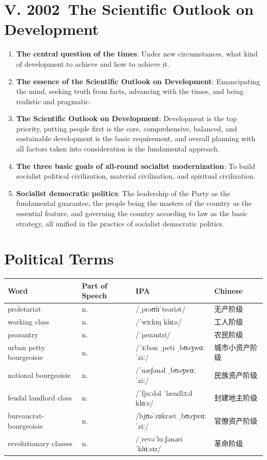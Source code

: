 \documentclass[11pt,a4paper]{ctexart}
\begin{document}
\section{V. 2002~The Scientific Outlook on Development}

\begin{enumerate}[leftmargin=2em]
    \item \textbf{The central question of the times}: Under new circumstances, what kind of development to achieve and how to achieve it.
    
    \item \textbf{The essence of the Scientific Outlook on Development}: Emancipating the mind, seeking truth from facts, advancing with the times, and being realistic and pragmatic.
    
    \item \textbf{The Scientific Outlook on Development}: Development is the top priority, putting people first is the core, comprehensive, balanced, and sustainable development is the basic requirement, and overall planning with all factors taken into consideration is the fundamental approach.
    
    \item \textbf{The three basic goals of all-round socialist modernization}: To build socialist political civilization, material civilization, and spiritual civilization.
    
    \item \textbf{Socialist democratic politics}: The leadership of the Party as the fundamental guarantee, the people being the masters of the country as the essential feature, and governing the country according to law as the basic strategy, all unified in the practice of socialist democratic politics.
\end{enumerate}

\section{Political Terms}

\begin{center}
\small
\setlength{\tabcolsep}{10pt}
\begin{tabular}{llll}
\toprule
Word & Part of Speech & IPA & Chinese \\
\midrule
proletariat & n. & /ˌprəʊlɪˈteəriət/ & 无产阶级 \\
working class & n. & /ˈwɜːkɪŋ klɑːs/ & 工人阶级 \\
peasantry & n. & /ˈpezəntri/ & 农民阶级 \\
urban petty bourgeoisie & n. & /ˈɜːbən ˌpeti ˌbʊəʒwɑːˈziː/ & 城市小资产阶级 \\
national bourgeoisie & n. & /ˈnæʃənəl ˌbʊəʒwɑːˈziː/ & 民族资产阶级 \\
feudal landlord class & n. & /ˈfjuːdəl ˈlændlɔːd klɑːs/ & 封建地主阶级 \\
bureaucrat-bourgeoisie & n. & /bjʊəˈrɒkræt ˌbʊəʒwɑːˈziː/ & 官僚资产阶级 \\
revolutionary classes & n. & /ˌrevəˈluːʃənəri ˈklɑːsɪz/ & 革命阶级 \\
\bottomrule
\end{tabular}
\end{center}
\end{document}
